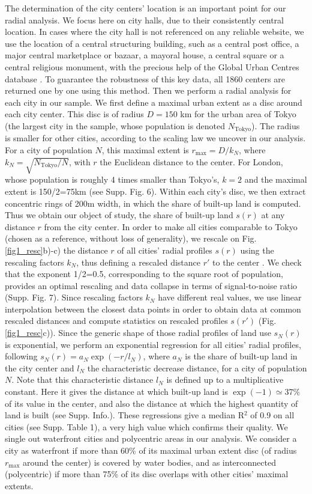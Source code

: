\documentclass[sn-mathphys-num]{sn-jnl}%
\theoremstyle{thmstyleone}%
\theoremstyle{thmstyletwo}%
\theoremstyle{thmstylethree}%
\begin{document}
The determination of the city centers' location is an important point for our radial analysis. We focus here on city halls, due to their consistently central location. In cases where the city hall is not referenced on any reliable website, we use the location of a central structuring building, such as a central post office, a major central marketplace or bazaar, a mayoral house, a central square or a central religious monument, with the precious help of the Global Urban Centres database \cite{kilgarriff_2021}. To guarantee the robustness of this key data, all 1860 centers are returned one by one using this method. Then we perform a radial analysis for each city in our sample. We first define a maximal urban extent as a disc around each city center. This disc is of radius $D=150$ km for the urban area of Tokyo (the largest city in the sample, whose population is denoted $N_\text{Tokyo}$). The radius is smaller for other cities, according to the scaling law we uncover in our analysis. For a city of population $N$, this maximal extent is $r_{\text{max}}=D/k_N$, where $k_N=\sqrt{N_{\text{Tokyo}}/N}$, with $r$ the Euclidean distance to the center. For London, whose population is roughly 4 times smaller than Tokyo's, $k=2$ and the maximal extent is 150/2=75km (see Supp. Fig. 6). Within each city's disc, we then extract concentric rings of 200m width, in which the share of built-up land is computed. Thus we obtain our object of study, the share of built-up land $s(r)$ at any distance $r$ from the city center.
In order to make all cities comparable to Tokyo (chosen as a reference, without loss of generality), we rescale on Fig. \ref{fig1_resc}b)-c) the distance $r$ of all cities' radial profiles $s(r)$ using the rescaling factors $k_N$, thus defining a rescaled distance $r'$ to the center . We check that the exponent 1/2=0.5, corresponding to the square root of population, provides an optimal rescaling and data collapse in terms of signal-to-noise ratio (Supp. Fig. 7). Since rescaling factors $k_N$ have different real values, we use linear interpolation between the closest data points in order to obtain data at common rescaled distances and compute statistics on rescaled profiles $s(r')$ (Fig. \ref{fig1_resc}c)).
Since the generic shape of those radial profiles of land use $s_N(r)$ is exponential, we perform an exponential regression for all cities' radial profiles, following $s_N(r)=a_N \exp(-r/l_N)$, where $a_N$ is the share of built-up land in the city center and $l_N$ the characteristic decrease distance, for a city of population $N$. Note that this characteristic distance $l_N$ is defined up to a multiplicative constant. Here it gives the distance at which built-up land is $\exp(-1)\simeq 37\%$ of its value in the center, and also the distance at which the highest quantity of land is built (see Supp. Info.). These regressions give a median R$^2$ of 0.9 on all cities (see Supp. Table 1), a very high value which confirms their quality. We single out waterfront cities and polycentric areas in our analysis. We consider a city as waterfront if more than 60\% of its maximal urban extent disc (of radius $r_{\text{max}}$ around the center) is covered by water bodies, and as interconnected (polycentric) if more than 75\% of its disc overlaps with other cities' maximal extents.
\end{document}
